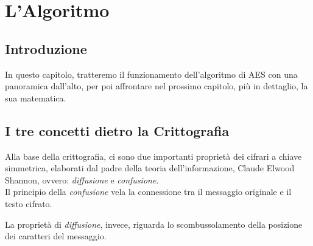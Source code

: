 
\chapter{L'Algoritmo}




\section{Introduzione}


\textsf{\small In questo capitolo, tratteremo il funzionamento dell'algoritmo di AES con una panoramica dall'alto, per poi affrontare nel prossimo capitolo, più in dettaglio, la sua matematica.}



\section{I tre concetti dietro la Crittografia} %

    

\textsf{\small Alla base della crittografia, ci sono due importanti proprietà dei cifrari a chiave simmetrica, elaborati dal padre della teoria dell'informazione, Claude Elwood Shannon, ovvero: \emph{diffusione} e \emph{confusione}.} \\

\textsf{\small Il principio della \emph{confusione} vela la connessione tra il messaggio originale e il testo cifrato.} %

\textsf{\small La proprietà di \emph{diffusione}, invece, riguarda lo scombussolamento della posizione dei caratteri del messaggio.} %

